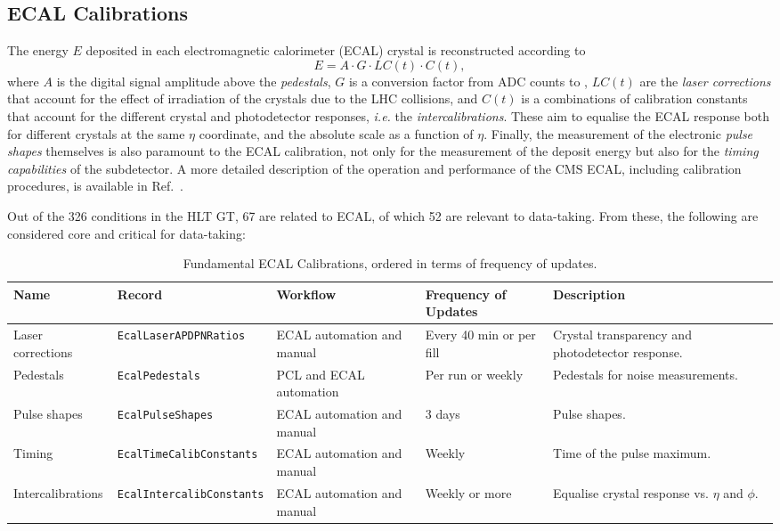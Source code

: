 \subsection{ECAL Calibrations}

The energy $E$ deposited in each electromagnetic calorimeter (ECAL) crystal is reconstructed according to 
\[
E = A \cdot G \cdot LC(t) \cdot C(t),
\]
where
$A$ is the digital signal amplitude above the \emph{pedestals},
$G$ is a conversion factor from ADC counts to \GeV,
$LC(t)$ are the \emph{laser corrections} that account for the effect of irradiation of the crystals due to the LHC collisions, and
$C(t)$ is a combinations of calibration constants that account for the different crystal and photodetector responses, \textit{i.e.} the \emph{intercalibrations}.
These aim to equalise the ECAL response both for different crystals at the same $\eta$ coordinate,
and
the absolute scale as a function of $\eta$.
Finally, the measurement of the electronic \emph{pulse shapes} themselves is also paramount to the ECAL calibration, not only for the measurement of the deposit energy but also for the \emph{timing capabilities} of the subdetector.
A more detailed description of
the operation and performance of the CMS ECAL,
including calibration procedures,
is available in Ref.~\cite{CMS:2024ppo}.

Out of the 326 conditions in the HLT GT,
67 are related to ECAL, %
of which 52 are relevant to \Runthree data-taking. %
From these, the following are considered core and critical for data-taking:
\begin{table}[h!]
    \centering
    \begin{adjustbox}{max width=\textwidth}
    \begin{tabular}{p{3.5cm}|p{4.5cm}|p{2.5cm}|p{2cm}|p{4cm}}
        \textbf{Name} & \textbf{Record} & \textbf{Workflow} & \textbf{Frequency of Updates} & \textbf{Description} \\ \hline
    Laser corrections & \texttt{EcalLaserAPDPNRatios} & ECAL automation and manual & Every 40 min or per fill & Crystal transparency and photodetector response. \\
    Pedestals & \texttt{EcalPedestals} & PCL and ECAL automation & Per run or weekly & Pedestals for noise measurements. \\
    Pulse shapes & \texttt{EcalPulseShapes} & ECAL automation and manual & 3 days & Pulse shapes. \\
    Timing & \texttt{EcalTimeCalibConstants} & ECAL automation and manual & Weekly & Time of the pulse maximum.\\
    Intercalibrations & \texttt{EcalIntercalibConstants} & ECAL automation and manual & Weekly or more & Equalise crystal response vs. $\eta$ and $\phi$.
    \end{tabular}
    \end{adjustbox}
    \caption{Fundamental ECAL Calibrations, ordered in terms of frequency of updates.}
    \label{tab:ECALCalibrations_critical}
\end{table}

